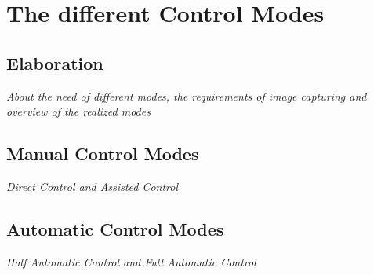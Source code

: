 
\chapter{The different Control Modes}
\label{cha:DifferentControlModes}
\section{Elaboration}
\label{sec:elaboration}
\textit{About the need of different modes, the requirements of image capturing and overview of the realized modes}
\section{Manual Control Modes}
\label{manualControlModes}
\textit{Direct Control and Assisted Control}
\section{Automatic Control Modes}
\label{automaticControlModes}
\textit{Half Automatic Control and Full Automatic Control}